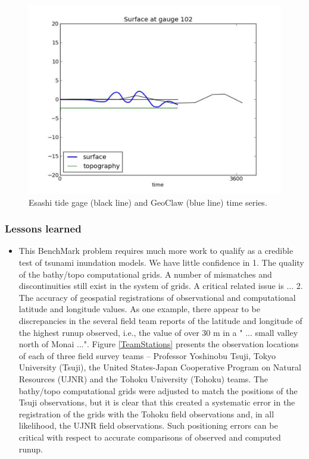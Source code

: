 \begin{figure}[ht]
\hfil\includegraphics[width=5.0in]{bp9/Esashi.pdf}\hfil
\caption{\label{Esashi}
Esashi tide gage (black line) and GeoClaw (blue line) time series. 
  }
\end{figure}

\subsubsection{Lessons learned}
\begin{itemize}
\item This BenchMark problem requires much more work to qualify as a credible test of tsunami inundation models.  We have little confidence in 
   1. The quality of the bathy/topo computational grids.  A number of mismatches and discontinuities still exist in the system of grids.  A critical related issue is ... 
   2. The accuracy of geospatial registrations of observational and computational latitude and longitude values.  As one example, there appear to be discrepancies in the several field team reports of the latitude and longitude of the highest runup observed, i.e., the value of over 30 m in a " ... small valley north of Monai ...".  Figure \ref{TeamStations} presents the observation locations of each of three field survey teams -- Professor Yoshinobu Tsuji, Tokyo University (Tsuji), the United States-Japan Cooperative Program on Natural Resources (UJNR) and the Tohoku University (Tohoku) teams.  The bathy/topo computational grids were adjusted to match the positions of the Tsuji observations, but it is clear that this created a systematic error in the registration of the grids with the Tohoku field observations and, in all likelihood, the UJNR field observations.  Such positioning errors can be critical with respect to accurate comparisons of observed and computed runup.
\end{itemize}

